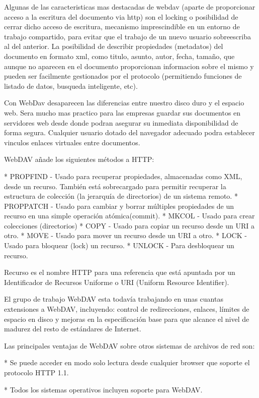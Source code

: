 Algunas de las caracteristicas mas destacadas de webdav (aparte de proporcionar acceso a la escritura del documento via http) son el locking o posibilidad de cerrar dicho acceso de escritura, mecanismo imprescindible en un entorno de trabajo compartido, para evitar que el trabajo de un nuevo usuario sobreescriba al del anterior. La posibilidad de describir propiedades (metadatos) del documento en formato xml, como titulo, asunto, autor, fecha, tamaño, que aunque no aparecen en el documento proporcionan informacion sobre el mismo y pueden ser facilmente gestionados por el protocolo (permitiendo funciones de listado de datos, busqueda inteligente, etc).

Con WebDav desaparecen las diferencias entre nuestro disco duro y el espacio web. Sera mucho mas practico para las empresas guardar sus documentos en servidores web desde donde podran asegurar su inmediata disponibilidad de forma segura. Cualquier usuario dotado del navegador adecuado podra establecer vinculos enlaces virtuales entre documentos.

WebDAV añade los siguientes métodos a HTTP:

    * PROPFIND - Usado para recuperar propiedades, almacenadas como XML, desde un recurso. También está sobrecargado para permitir recuperar la estructura de colección (la jerarquía de directorios) de un sistema remoto.
    * PROPPATCH - Usado para cambiar y borrar múltiples propiedades de un recurso en una simple operación atómica(commit).
    * MKCOL - Usado para crear colecciones (directorios)
    * COPY - Usado para copiar un recurso desde un URI a otro.
    * MOVE - Usado para mover un recurso desde un URI a otro.
    * LOCK - Usado para bloquear (lock) un recurso.
    * UNLOCK - Para desbloquear un recurso.

Recurso es el nombre HTTP para una referencia que está apuntada por un Identificador de Recursos Uniforme o URI (Uniform Resource Identifier).

El grupo de trabajo WebDAV esta todavía trabajando en unas cuantas extensiones a WebDAV, incluyendo: control de redirecciones, enlaces, límites de espacio en disco y mejoras en la especificación base para que alcance el nivel de madurez del resto de estándares de Internet.

Las principales ventajas de WebDAV sobre otros sistemas de archivos de red son:

* Se puede acceder en modo solo lectura desde cualquier browser que soporte el protocolo HTTP 1.1.

* Todos los sistemas operativos incluyen soporte para WebDAV.

